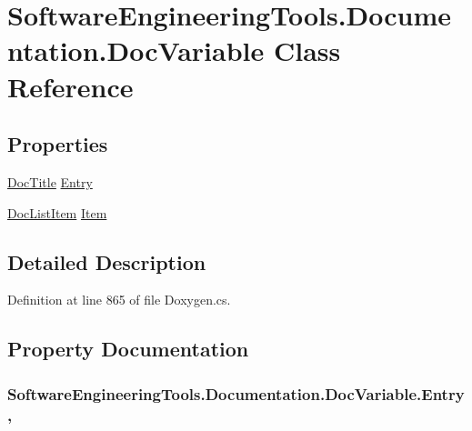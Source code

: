 \hypertarget{class_software_engineering_tools_1_1_documentation_1_1_doc_variable}{\section{Software\+Engineering\+Tools.\+Documentation.\+Doc\+Variable Class Reference}
\label{class_software_engineering_tools_1_1_documentation_1_1_doc_variable}
}
\subsection*{Properties}
\begin{DoxyCompactItemize}
\item 
\hyperlink{class_software_engineering_tools_1_1_documentation_1_1_doc_title}{Doc\+Title} \hyperlink{class_software_engineering_tools_1_1_documentation_1_1_doc_variable_a557371e1e88643a632222878c06ebe79}{Entry}
\item 
\hyperlink{class_software_engineering_tools_1_1_documentation_1_1_doc_list_item}{Doc\+List\+Item} \hyperlink{class_software_engineering_tools_1_1_documentation_1_1_doc_variable_a99e3e7284e92b1e6a93515da3c4d106d}{Item}
\end{DoxyCompactItemize}


\subsection{Detailed Description}


Definition at line 865 of file Doxygen.\+cs.



\subsection{Property Documentation}
\hypertarget{class_software_engineering_tools_1_1_documentation_1_1_doc_variable_a557371e1e88643a632222878c06ebe79}{
\subsubsection[{Entry}]{ Software\+Engineering\+Tools.\+Documentation.\+Doc\+Variable.\+Entry\hspace{0.3cm}{\ttfamily [get]}, {\ttfamily [set]}}}\label{class_software_engineering_tools_1_1_documentation_1_1_doc_variable_a557371e1e88643a632222878c06ebe79}


